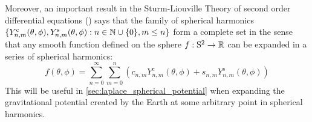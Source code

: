 \documentclass[../main.tex]{subfiles}
\begin{document}
Moreover, an important result in the Sturm-Liouville Theory of second order differential equations (\cite{wiki:sturmliouville,completenessSL}) says that the family of spherical harmonics $\{Y_{n,m}^{\mathrm{c}}(\theta,\phi),Y_{n,m}^{\mathrm{s}}(\theta,\phi):n\in\mathbb{N}\cup\{0\},m\leq n\}$ form a complete set in the sense that any smooth function defined on the sphere $f:\mathrm{S}^2\rightarrow\mathbb{R}$ can be expanded in a series of spherical harmonics:
\begin{equation}
  f(\theta,\phi)=\sum_{n=0}^\infty\sum_{m=0}^n (c_{n,m} Y_{n,m}^{\mathrm{c}}(\theta,\phi)+s_{n,m} Y_{n,m}^{\mathrm{s}}(\theta,\phi))
\end{equation}
This will be useful in \cref{sec:laplace_spherical_potential} when expanding the gravitational potential created by the Earth at some arbitrary point in spherical harmonics.
\end{document}
